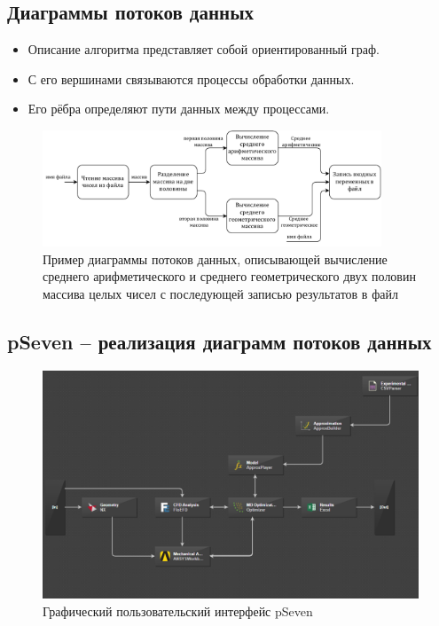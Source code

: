\subsection{Диаграммы потоков данных}
\begin{frame}
    \begin{itemize}
        \item Описание алгоритма представляет собой ориентированный граф.
        \item С его вершинами связываются процессы обработки данных.
        \item Его рёбра определяют пути данных между процессами.
    \end{itemize}

    \begin{figure}
        \centering
        \includegraphics[width=0.9\textwidth]{images/illustration.dataflow.pdf}
        \caption{Пример диаграммы потоков данных, описывающей вычисление среднего арифметического и среднего геометрического двух половин массива целых чисел с последующей записью результатов в файл}
    \end{figure}

\end{frame}


\subsection{pSeven -- реализация диаграмм потоков данных}
\begin{frame}
    \begin{figure}
        \centering
        \includegraphics[width=\textwidth]{images/workflow1.png}
        \caption{Графический пользовательский интерфейс pSeven}
    \end{figure}

\end{frame}

